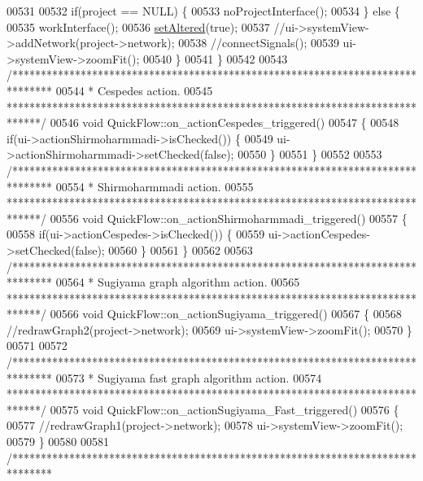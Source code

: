 \begin{DoxyCode}
00531 
00532   \textcolor{keywordflow}{if}(project == NULL) \{
00533     noProjectInterface();
00534   \} \textcolor{keywordflow}{else} \{
00535     workInterface();
00536     \hyperlink{group___window_ga4b63ea5ca52a9eea14db0a22b5a133f8}{setAltered}(\textcolor{keyword}{true});
00537     \textcolor{comment}{//ui->systemView->addNetwork(project->network);}
00538     \textcolor{comment}{//connectSignals();}
00539     ui->systemView->zoomFit();
00540   \}
00541 \}
00542 
00543 \textcolor{comment}{/*******************************************************************************}
00544 \textcolor{comment}{ * Cespedes action.}
00545 \textcolor{comment}{ ******************************************************************************/}
00546 \textcolor{keywordtype}{void} QuickFlow::on\_actionCespedes\_triggered()
00547 \{
00548   \textcolor{keywordflow}{if}(ui->actionShirmoharmmadi->isChecked()) \{
00549     ui->actionShirmoharmmadi->setChecked(\textcolor{keyword}{false});
00550   \}
00551 \}
00552 
00553 \textcolor{comment}{/*******************************************************************************}
00554 \textcolor{comment}{ * Shirmoharmmadi action.}
00555 \textcolor{comment}{ ******************************************************************************/}
00556 \textcolor{keywordtype}{void} QuickFlow::on\_actionShirmoharmmadi\_triggered()
00557 \{
00558   \textcolor{keywordflow}{if}(ui->actionCespedes->isChecked()) \{
00559     ui->actionCespedes->setChecked(\textcolor{keyword}{false});
00560   \}
00561 \}
00562 
00563 \textcolor{comment}{/*******************************************************************************}
00564 \textcolor{comment}{ * Sugiyama graph algorithm action.}
00565 \textcolor{comment}{ ******************************************************************************/}
00566 \textcolor{keywordtype}{void} QuickFlow::on\_actionSugiyama\_triggered()
00567 \{
00568   \textcolor{comment}{//redrawGraph2(project->network);}
00569   ui->systemView->zoomFit();
00570 \}
00571 
00572 \textcolor{comment}{/*******************************************************************************}
00573 \textcolor{comment}{ * Sugiyama fast graph algorithm action.}
00574 \textcolor{comment}{ ******************************************************************************/}
00575 \textcolor{keywordtype}{void} QuickFlow::on\_actionSugiyama\_Fast\_triggered()
00576 \{
00577   \textcolor{comment}{//redrawGraph1(project->network);}
00578   ui->systemView->zoomFit();
00579 \}
00580 
00581 \textcolor{comment}{/*******************************************************************************}

\end{DoxyCode}
